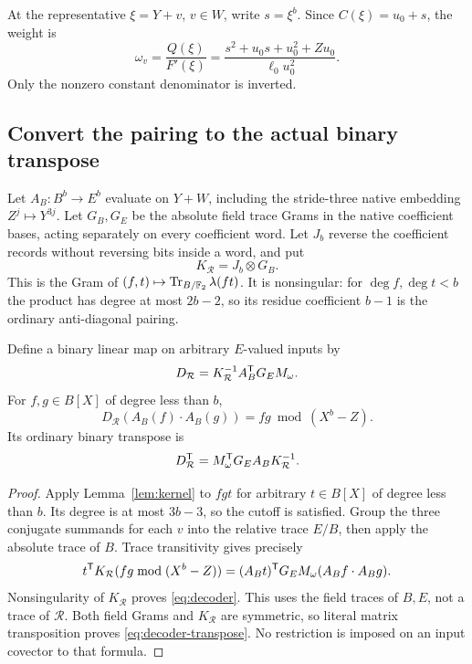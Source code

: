 At the representative $\xi=Y+v$, $v\in W$, write $s=\xi^b$.
Since $C(\xi)=u_0+s$, the weight is
\begin{equation}\label{eq:omega}
 \omega_v=\frac{Q(\xi)}{F'(\xi)}
 =\frac{s^2+u_0s+u_0^2+Zu_0}{\ell_0u_0^2}.
\end{equation}
Only the nonzero constant denominator is inverted.

\subsection{Convert the pairing to the actual binary transpose}
Let $A_B:B^b\to E^b$ evaluate on $Y+W$, including the stride-three
native embedding $Z^j\mapsto Y^{3j}$. Let $G_B,G_E$ be the absolute
field trace Grams in the native coefficient bases, acting separately
on every coefficient word. Let $J_b$ reverse the coefficient records
without reversing bits inside a word, and put
\[
 K_{\mathcal R}=J_b\otimes G_B.
\]
This is the Gram of
$(f,t)\mapsto\operatorname{Tr}_{B/\mathbb F_2}\lambda(ft)$. It is nonsingular: for
$\deg f,\deg t<b$ the product has degree at most $2b-2$, so its
residue coefficient $b-1$ is the ordinary anti-diagonal pairing.

\begin{proposition}\label{prop:decoder}
Define a binary linear map on arbitrary $E$-valued inputs by
\begin{equation}\label{eq:decoder}
 D_{\mathcal R}=K_{\mathcal R}^{-1}A_B^{\mathsf T}G_E M_\omega.
\end{equation}
For $f,g\in B[X]$ of degree less than $b$,
\[
 D_{\mathcal R}(A_B(f)\cdot A_B(g))=fg\bmod(X^b-Z).
\]
Its ordinary binary transpose is
\begin{equation}\label{eq:decoder-transpose}
 D_{\mathcal R}^{\mathsf T}=M_\omega^{\mathsf T}G_E A_B K_{\mathcal R}^{-1}.
\end{equation}
\end{proposition}
\begin{proof}
Apply Lemma~\ref{lem:kernel} to $fgt$ for arbitrary $t\in B[X]$
of degree less than $b$. Its degree is at most $3b-3$, so the cutoff
is satisfied. Group the three conjugate summands for each $v$ into
the relative trace $E/B$, then apply the absolute trace of $B$.
Trace transitivity gives precisely
\[
 t^{\mathsf T}K_{\mathcal R}(fg\bmod(X^b-Z))
 = (A_Bt)^{\mathsf T}G_E M_\omega(A_Bf\cdot A_Bg).
\]
Nonsingularity of $K_{\mathcal R}$ proves \eqref{eq:decoder}.
This uses the field traces of $B,E$, not a trace of $\mathcal R$.
Both field Grams and $K_{\mathcal R}$ are symmetric, so literal
matrix transposition proves \eqref{eq:decoder-transpose}.
No restriction is imposed on an input covector to that formula.
\end{proof}

